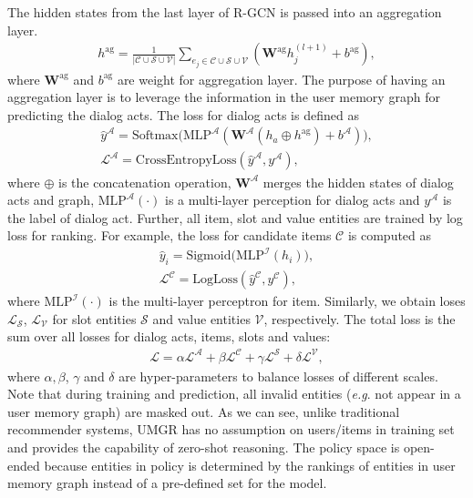 \documentclass[11pt,a4paper]{article}
\makeatletter
\DeclareRobustCommand\onedot{\futurelet\@let@token\@onedot}
\def\onedot{. }
\def\eg{\emph{e.g}\onedot} \def\Eg{\emph{E.g}\onedot}
\makeatother
\begin{document}
The hidden states from the last layer of R-GCN is passed into an aggregation layer.
\begin{equation}
\begin{split}
h^{\text{ag}} = \frac{1}{\vert \mathcal{C} \cup \mathcal{S} \cup \mathcal{V} \vert} \sum_{e_j \in \mathcal{C} \cup \mathcal{S} \cup \mathcal{V}} (\boldsymbol{W}^\text{ag} h_j^{(l+1)} + b^{\text{ag}}),
\end{split}
\end{equation}
where $\boldsymbol{W}^{\text{ag}}$ and $b^{\text{ag}}$ are weight for aggregation layer.
The purpose of having an aggregation layer is to leverage the information in the user memory graph for predicting the dialog acts.
The loss for dialog acts is defined as
\begin{equation}
\begin{split}
\hat{y}^{\mathcal{A}} = \text{Softmax}\Big(\text{MLP}^{\mathcal{A}}(\boldsymbol{W}^\mathcal{A} (h_a \oplus h^\text{ag}) +b^\mathcal{A}) \Big), \\
\mathcal{L}^{\mathcal{A}} = \text{CrossEntropyLoss}(\hat{y}^\mathcal{A}, y^\mathcal{A}),
\end{split}
\end{equation}
where $\oplus$ is the concatenation operation, $\boldsymbol{W}^\mathcal{A}$ merges the hidden states of dialog acts and graph, $\text{MLP}^{\mathcal{A}}(\cdot)$ is a multi-layer perception for dialog acts and $y^\mathcal{A}$ is the label of dialog act.
Further, all item, slot and value entities are trained by log loss for ranking. For example, the loss for candidate items $\mathcal{C}$ is computed as 
\begin{equation}
\begin{split}
\hat{y}_i = \text{Sigmoid}\Big(\text{MLP}^\mathcal{I}(h_i) \Big), \\
\mathcal{L}^\mathcal{C} = \text{LogLoss}(\hat{y}^\mathcal{C}, y^\mathcal{C}),
\end{split}
\end{equation}
where $\text{MLP}^\mathcal{I}(\cdot)$ is the multi-layer perceptron for item.
Similarly, we obtain loses $\mathcal{L}_\mathcal{S}$, $\mathcal{L}_\mathcal{V}$ for slot entities $\mathcal{S}$ and value entities $\mathcal{V}$, respectively.
The total loss is the sum over all losses for dialog acts, items, slots and values: 
\begin{equation}
\begin{split}
\mathcal{L} = \alpha\mathcal{L}^\mathcal{A} + \beta\mathcal{L}^\mathcal{C} + \gamma\mathcal{L}^\mathcal{S} + \delta\mathcal{L}^\mathcal{V},
\end{split}
\end{equation}
where $\alpha, \beta$, $\gamma$ and $\delta$ are hyper-parameters to balance losses of different scales.
Note that during training and prediction, all invalid entities (\eg not appear in a user memory graph) are masked out.
As we can see, unlike traditional recommender systems, UMGR has no assumption on users/items in training set and provides the capability of zero-shot reasoning. The policy space is open-ended because entities in policy is determined by the rankings of entities in user memory graph instead of a pre-defined set for the model.
\end{document}

